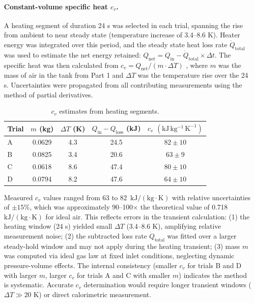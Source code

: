 \documentclass[12pt]{article}
\begin{document}
\paragraph{Constant-volume specific heat $c_v$.} A heating segment of duration 24 s was selected in each trial, spanning the rise from ambient to near steady state (temperature increase of 3.4–8.6 K). 
Heater energy was integrated over this period, and the steady state heat loss rate $\dot{Q}_{\text{total}}$ was used to estimate the net energy retained: $Q_{\text{net}} = Q_{\text{in}} - \dot{Q}_{\text{total}} \times \Delta t$. 
The specific heat was then calculated from $c_v = Q_{\text{net}} / (m \cdot \Delta T)$ \cite{che260_manual}, where $m$ was the mass of air in the tank from Part 1 and $\Delta T$ was the temperature rise over the 24 s. Uncertainties were propagated from all contributing measurements using the method of partial derivatives.


\begin{table}[H]\centering
\begin{tabular}{@{}lcccc@{}}
\toprule
Trial & $m$ (kg) & $\Delta T$ (K) & $Q_{\text{in}}-Q_{\text{loss}}$ (kJ) & $c_v$ $(\mathrm{kJ\,kg^{-1}\,K^{-1}})$ \\
\midrule
A & 0.0629 & 4.3 & 24.5 & $82 \pm 10$ \\
B & 0.0825 & 3.4 & 20.6 & $63 \pm 9$ \\
C & 0.0618 & 8.6 & 47.4 & $80 \pm 10$ \\
D & 0.0794 & 8.2 & 47.6 & $64 \pm 10$ \\
\bottomrule
\end{tabular}
\caption{$c_v$ estimates from heating segments.}
\label{tab:cv}
\end{table}

Measured $c_v$ values ranged from 63 to 82~$\mathrm{kJ/(kg \cdot K)}$ with relative uncertainties of $\pm 15\%$, which was approximately 90--100$\times$ the theoretical value of 0.718~$\mathrm{kJ/(kg \cdot K)}$ for ideal air. 
This reflects errors in the transient calculation: (1) the heating window (24 s) yielded small $\Delta T$ (3.4--8.6 K), amplifying relative measurement noise; (2) the subtracted loss rate $\dot{Q}_{\text{total}}$ was fitted over a larger steady-hold window and may not apply during the heating transient; (3) mass $m$ was computed via ideal gas law at fixed inlet conditions, neglecting dynamic pressure-volume effects. The internal consistency (smaller $c_v$ for trials B and D with larger $m$, larger $c_v$ for trials A and C with smaller $m$) indicates the method is systematic. Accurate $c_v$ determination would require longer transient windows ($\Delta T \gg 20$ K) or direct calorimetric measurement.
\end{document}
